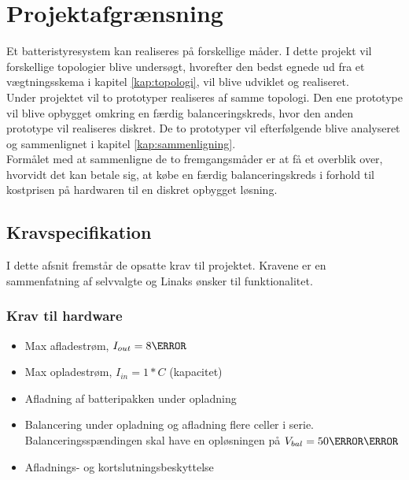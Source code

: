 \section{Projektafgrænsning}
Et batteristyresystem kan realiseres på forskellige måder. I dette projekt vil forskellige topologier blive undersøgt, hvorefter den bedst egnede ud fra et vægtningsskema i kapitel \ref{kap:topologi}, vil blive udviklet og realiseret. 
\\

Under projektet vil to prototyper realiseres af samme topologi. Den ene prototype vil blive opbygget omkring en færdig balanceringskreds, hvor den anden prototype vil realiseres diskret. De to prototyper vil efterfølgende blive analyseret og sammenlignet i kapitel \ref{kap:sammenligning}.
\\

Formålet med at sammenligne de to fremgangsmåder er at få et overblik over, hvorvidt det kan betale sig, at købe en færdig balanceringskreds i forhold til kostprisen på hardwaren til en diskret opbygget løsning.


\subsection{Kravspecifikation} \label{afs:kravspecifikation}
I dette afsnit fremstår de opsatte krav til projektet. Kravene er en sammenfatning af selvvalgte og Linaks ønsker til funktionalitet.
\subsubsection{Krav til hardware}
\begin{itemize}[noitemsep]
	\item Max afladestrøm, $I_{out} = 8\ampere$
	\item Max opladestrøm, $I_{in} = 1*C$ (kapacitet)
	\item Afladning af batteripakken under opladning
	\item Balancering under opladning og afladning flere celler i serie. Balanceringsspændingen skal have en opløsningen på  $V_{bal} = 50\milli\volt$
	\item Afladnings- og kortslutningsbeskyttelse
\end{itemize}
